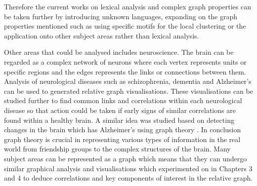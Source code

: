 Therefore the current works on lexical analysis and complex graph properties can be taken further by introducing unknown languages, expanding on the graph properties mentioned such as using specific motifs for the local clustering or the application onto other subject areas rather than lexical analysis.

Other areas that could be analysed includes neuroscience. The brain \cite{de2014graph} can be regarded as a complex network of neurons where each vertex represents units or specific regions and the edges represents the links or connections between them. Analysis of neurological diseases such as schizophrenia, dementia and Alzheimer's can be used to generated relative graph visualisations. These visualisations can be studied further to find common links and correlations within each neurological disease so that action could be taken if early signs of similar correlations are found within a healthy brain. A similar idea was studied based on detecting changes in the brain which has Alzheimer's using graph theory \cite{10.1093/braincomms/fcaa129}.
In conclusion graph theory is crucial in representing various types of information in the real world from friendship groups to the complex structures of the brain. Many subject areas can be represented as a graph which means that they can undergo similar graphical analysis and visualisations which experimented on in Chapters 3 and 4 to deduce correlations and key components of interest in the relative graph.
